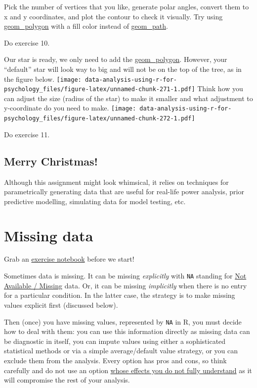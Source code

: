 \documentclass[
]{book}
\begin{document}
Pick the number of vertices that you like, generate polar angles, convert them to x and y coordinates, and plot the contour to check it visually. Try using \href{https://ggplot2.tidyverse.org/reference/geom_polygon.html}{geom\_polygon} with a fill color instead of \href{https://ggplot2.tidyverse.org/reference/geom_path.html}{geom\_path}.

Do exercise 10.

Our star is ready, we only need to add the \href{https://ggplot2.tidyverse.org/reference/geom_polygon.html}{geom\_polygon}. However, your ``default'' star will look way to big and will not be on the top of the tree, as in the figure below.
\texttt{[image: data-analysis-using-r-for-psychology\_files/figure-latex/unnamed-chunk-271-1.pdf]}
Think how you can adjust the size (radius of the star) to make it smaller and what adjustment to y-coordinate do you need to make.
\texttt{[image: data-analysis-using-r-for-psychology\_files/figure-latex/unnamed-chunk-272-1.pdf]}

Do exercise 11.

\hypertarget{merry-christmas}{%
\section{Merry Christmas!}\label{merry-christmas}}

Although this assignment might look whimsical, it relies on techniques for parametrically generating data that are useful for real-life power analysis, prior predictive modelling, simulating data for model testing, etc.

\hypertarget{missing-data}{%
\chapter{Missing data}\label{missing-data}}

Grab an \href{notebooks/Seminar\%2011\%20-\%20missing\%20data.Rmd}{exercise notebook} before we start!

Sometimes data is missing. It can be missing \emph{explicitly} with \texttt{NA} standing for \href{https://stat.ethz.ch/R-manual/R-devel/library/base/html/NA.html}{Not Available / Missing} data. Or, it can be missing \emph{implicitly} when there is no entry for a particular condition. In the latter case, the strategy is to make missing values explicit first (discussed below).

Then (once) you have missing values, represented by \texttt{NA} in R, you must decide how to deal with them: you can use this information directly as missing data can be diagnostic in itself, you can impute values using either a sophisticated statistical methods or via a simple average/default value strategy, or you can exclude them from the analysis. Every option has pros and cons, so think carefully and do not use an option \href{https://www.reddit.com/r/AskStatistics/comments/rvw9ur/is_it_best_to_fill_in_missing_data_with_0s/}{whose effects you do not fully understand} as it will compromise the rest of your analysis.
\end{document}
